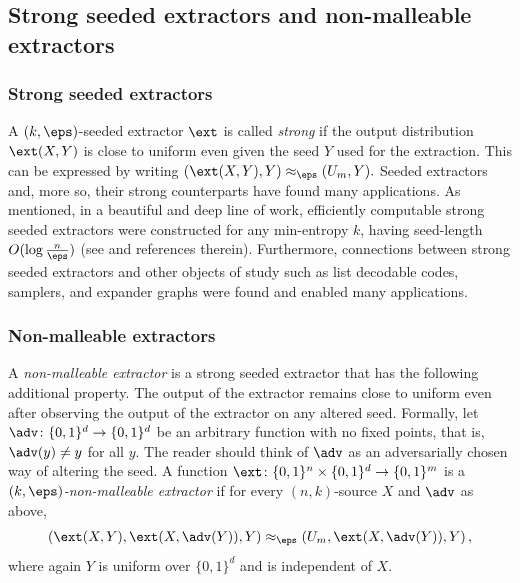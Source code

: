 \documentclass[11pt]{article}
\numberwithin{equation}{section}
\theoremstyle{definition}
\theoremstyle{plain}
\begin{document}
%
%

%

\subsection{Strong seeded extractors and non-malleable extractors}\label{sec:strong and nm}

%
%
\subsubsection{Strong seeded extractors}
%
A $(k,\eps)$-seeded extractor $\ext$ is called \emph{strong} if the output distribution $\ext(X,Y)$ is close to uniform even given the seed $Y$ used for the extraction. This can be expressed by writing
$
(\ext(X,Y),Y) \approx_\eps (U_m,Y).
$
Seeded extractors and, more so, their strong counterparts have found many applications. As mentioned, in a beautiful and deep line of work, efficiently computable strong seeded extractors were constructed for any min-entropy $k$, having seed-length $O(\log\frac{n}{\eps})$ (see \cite{GUV09,DKSS13,TSU12} and references therein). Furthermore,  connections between strong seeded extractors and other objects of study such as list decodable codes, samplers, and expander graphs were found and enabled many applications.%

%
%
\subsubsection{Non-malleable extractors}
%
A \emph{non-malleable extractor} is a strong seeded extractor that has the following additional property. The output of the extractor remains close to uniform even after observing the output of the extractor on any altered seed. Formally, let $\adv \colon \{0,1\}^d \to \{0,1\}^d$ be an arbitrary function with no fixed points, that is, $\adv(y) \neq y$ for all $y$. The reader should think of $\adv$ as an adversarially chosen way of altering the seed. A function $\ext \colon \{0,1\}^n \times \{0,1\}^d \to \{0,1\}^m$ is a \emph{$(k,\eps)$-non-malleable extractor} if for every $(n,k)$-source $X$ and $\adv$ as above,
\begin{equation}\label{eq:nmext}
(\ext(X,Y),\ext(X,\adv(Y)),Y) \approx_\eps (U_m, \ext(X,\adv(Y)),Y)\,,
\end{equation}
where again $Y$ is uniform over $\{0,1\}^d$ and is independent of $X$. %
\end{document}
